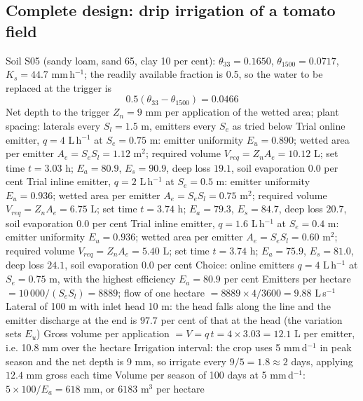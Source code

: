 \subsection{Complete design: drip irrigation of a tomato field}
\sol
\ans Soil S05 (sandy loam, sand 65, clay 10 per cent): $\theta_{33}=0.1650$, $\theta_{1500}=0.0717$, $K_s=44.7$ mm\,h$^{-1}$; the readily available fraction is 0.5, so the water to be replaced at the trigger is \[0.5(\theta_{33}-\theta_{1500})=0.0466\]
\ans Net depth to the trigger $Z_n=9$ mm per application of the wetted area; plant spacing: laterals every $S_l=1.5$ m, emitters every $S_e$ as tried below
\ans Trial online emitter, $q=4$ L\,h$^{-1}$ at $S_e=0.75$ m: emitter uniformity $E_u=0.890$; wetted area per emitter $A_e=S_eS_l=1.12$ m$^2$; required volume $V_{req}=Z_nA_e=10.12$ L; set time $t=3.03$ h; $E_a=80.9$, $E_s=90.9$, deep loss $19.1$, soil evaporation $0.0$ per cent
\ans Trial inline emitter, $q=2$ L\,h$^{-1}$ at $S_e=0.5$ m: emitter uniformity $E_u=0.936$; wetted area per emitter $A_e=S_eS_l=0.75$ m$^2$; required volume $V_{req}=Z_nA_e=6.75$ L; set time $t=3.74$ h; $E_a=79.3$, $E_s=84.7$, deep loss $20.7$, soil evaporation $0.0$ per cent
\ans Trial inline emitter, $q=1.6$ L\,h$^{-1}$ at $S_e=0.4$ m: emitter uniformity $E_u=0.936$; wetted area per emitter $A_e=S_eS_l=0.60$ m$^2$; required volume $V_{req}=Z_nA_e=5.40$ L; set time $t=3.74$ h; $E_a=75.9$, $E_s=81.0$, deep loss $24.1$, soil evaporation $0.0$ per cent
\ans Choice: online emitters $q=4$ L\,h$^{-1}$ at $S_e=0.75$ m, with the highest efficiency $E_a=80.9$ per cent
\ans Emitters per hectare $=10\,000/(S_eS_l)=8889$; flow of one hectare $=8889\times4/3600=9.88$ L\,s$^{-1}$
\ans Lateral of 100 m with inlet head 10 m: the head falls along the line and the emitter discharge at the end is $97.7$ per cent of that at the head (the variation sets $E_u$)
\ans Gross volume per application $=V=q\,t=4\times3.03=12.1$ L per emitter, i.e. 10.8 mm over the hectare
\ans Irrigation interval: the crop uses 5 mm\,d$^{-1}$ in peak season and the net depth is 9 mm, so irrigate every $9/5=1.8\approx2$ days, applying $12.4$ mm gross each time
\ans Volume per season of 100 days at 5 mm\,d$^{-1}$: $5\times100/E_a=618$ mm, or $6183$ m$^3$ per hectare \finans


